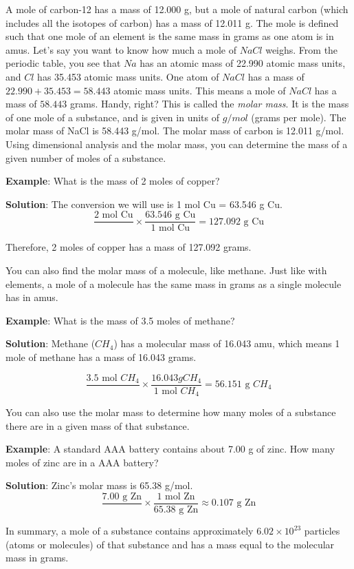 A mole of carbon-12 has a mass of 12.000 g, but a mole of natural carbon (which
includes all the isotopes of carbon) has a mass of 12.011 g. The mole is defined 
such that one mole of an element is the same mass in grams as one atom is in amus.
Let's say you want to know how much a mole of $NaCl$ weighs. From the periodic 
table, you see that $Na$ has an atomic mass of 22.990 atomic mass units, and $Cl$ 
has 35.453 atomic mass units. One atom of $NaCl$ has a mass of $22.990 + 35.453 = 
58.443$ atomic mass units. This means a mole of $NaCl$ has a mass of $58.443$ 
grams. Handy, right? This is called the \textit{molar mass}. It is the mass of one
mole of a substance, and is given in units of $g/mol$ (grams per mole). The molar 
mass of NaCl is 58.443 g/mol. The molar mass of carbon is 12.011 g/mol. Using 
dimensional analysis and the molar mass, you can determine the mass of a given 
number of moles of a substance. 

\textbf{Example}: What is the mass of 2 moles of copper?

\textbf{Solution}: The conversion we will use is 1 mol Cu = 63.546 g Cu.
$$\frac{2 \text{ mol Cu}}{} \times \frac{63.546\text{ g Cu}}{1\text{ mol Cu}} = 
127.092\text{ g Cu}$$

Therefore, 2 moles of copper has a mass of 127.092 grams. 

You can also find the molar mass of a molecule, like methane. Just like with 
elements, a mole of a molecule has the same mass in grams as a single molecule has
in amus. 

\textbf{Example}: What is the mass of 3.5 moles of methane?

\textbf{Solution}: Methane ($CH_4$) has a molecular mass of 16.043 amu, which 
means 1 mole of methane has a mass of 16.043 grams. 

$$\frac{3.5\text{ mol }CH_4}{} \times \frac{16.043{ g }CH_4}{1\text{ mol }CH_4} = 
56.151\text{ g }CH_4$$

You can also use the molar mass to determine how many moles of a substance there 
are in a given mass of that substance.

\textbf{Example}: A standard AAA battery contains about 7.00 g of zinc. How many 
moles of zinc are in a AAA battery?

\textbf{Solution}: Zinc's molar mass is 65.38 g/mol. 
$$\frac{7.00\text{ g Zn}}{} \times \frac{1\text{ mol Zn}}{65.38\text{ g Zn}} 
\approx 0.107\text{ g Zn}$$

In summary, a mole of a substance contains approximately $6.02 \times 10^{23}$ 
particles (atoms or molecules) of that substance and has a mass equal to the 
molecular mass in grams. 

